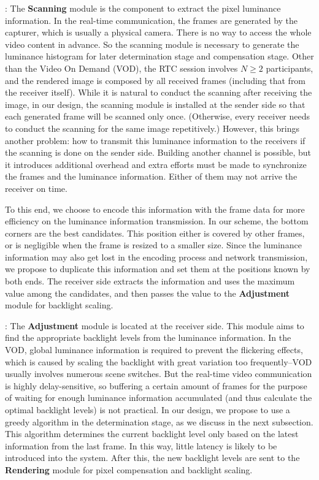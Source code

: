 :
The {\bf Scanning} module is the component to extract the pixel
luminance information. In the real-time communication, the frames are
generated by the capturer, which is usually a physical camera. There
is no way to access the whole video content in advance. So the
scanning module is necessary to generate the luminance histogram for
later determination stage and compensation stage. Other than the Video
On Demand (VOD), the RTC session involves $N \ge 2$ participants, and
the rendered image is composed by all received frames (including that
from the receiver itself). While it is natural to conduct the scanning
after receiving the image, in our design,  the scanning module is
installed at the sender side so that each generated frame will be
scanned only once. (Otherwise, every receiver needs to conduct the
scanning for the same image repetitively.)  However, this brings
another problem: how to transmit this luminance information to the
receivers if the scanning is done on the sender side. Building another
channel is possible, but it introduces additional overhead and extra
efforts must be made to synchronize the frames and the luminance
information. Either of them may not arrive the receiver on time.

To this end, we choose to encode this information with the frame data
for more efficiency on the luminance information transmission.  In our
scheme, the bottom corners are the best candidates. This position
either is covered by other frames, or is negligible when the frame is
resized to a smaller size.  Since the luminance information may also get
lost in the encoding process and network transmission, we propose to
duplicate this information and set them at the positions known by both
ends. The receiver side extracts the information and uses the maximum value
among the candidates, and then passes the value to the {\bf
  Adjustment} module for backlight scaling.

: The {\bf Adjustment} module is located at the receiver side. This
module aims to find the appropriate backlight levels from the
luminance information. In the VOD, global luminance information is
required to prevent the flickering effects, which is caused by scaling
the backlight with great variation too frequently--VOD usually
involves numerous scene switches. But 
 the real-time video communication is highly delay-sensitive, so buffering a certain
amount of frames for the purpose of waiting for enough luminance
information accumulated (and thus calculate the optimal backlight levels) is not
practical. In our design, we propose to use a greedy algorithm in the
determination stage, as we discuss in the next subsection. This
algorithm determines the current backlight level
only based on the latest information from the last frame. In this way,
little latency is likely to be introduced into the system. After this,
the new backlight levels are sent to the {\bf Rendering} module for
pixel compensation and backlight scaling.


